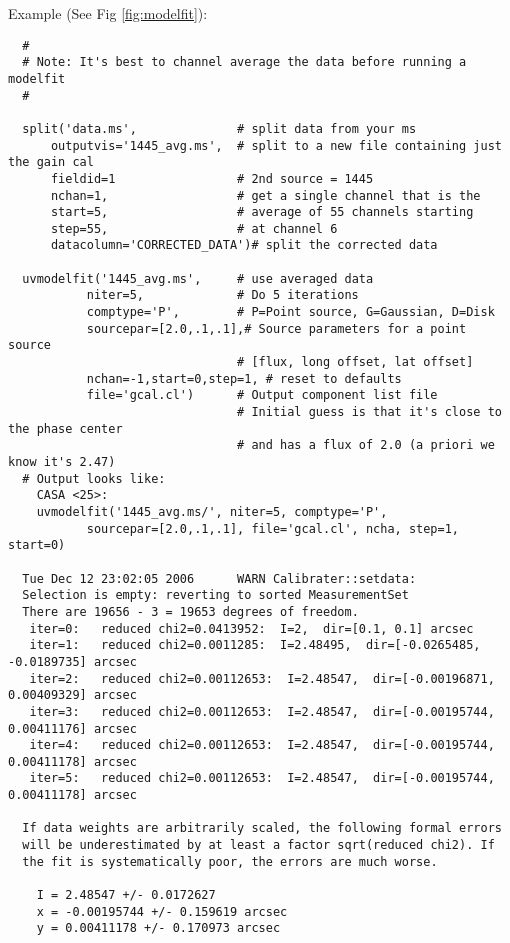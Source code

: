 Example (See Fig \ref{fig:modelfit}):

\small
\begin{verbatim}
  #
  # Note: It's best to channel average the data before running a modelfit
  #

  split('data.ms',              # split data from your ms
      outputvis='1445_avg.ms',  # split to a new file containing just the gain cal
      fieldid=1                 # 2nd source = 1445
      nchan=1,                  # get a single channel that is the
      start=5,                  # average of 55 channels starting
      step=55,                  # at channel 6
      datacolumn='CORRECTED_DATA')# split the corrected data

  uvmodelfit('1445_avg.ms',     # use averaged data
           niter=5,             # Do 5 iterations
           comptype='P',        # P=Point source, G=Gaussian, D=Disk
           sourcepar=[2.0,.1,.1],# Source parameters for a point source
                                # [flux, long offset, lat offset]
           nchan=-1,start=0,step=1, # reset to defaults
           file='gcal.cl')      # Output component list file
                                # Initial guess is that it's close to the phase center
                                # and has a flux of 2.0 (a priori we know it's 2.47)
  # Output looks like:
    CASA <25>:
    uvmodelfit('1445_avg.ms/', niter=5, comptype='P',
           sourcepar=[2.0,.1,.1], file='gcal.cl', ncha, step=1, start=0) 

  Tue Dec 12 23:02:05 2006      WARN Calibrater::setdata:
  Selection is empty: reverting to sorted MeasurementSet
  There are 19656 - 3 = 19653 degrees of freedom.
   iter=0:   reduced chi2=0.0413952:  I=2,  dir=[0.1, 0.1] arcsec
   iter=1:   reduced chi2=0.0011285:  I=2.48495,  dir=[-0.0265485, -0.0189735] arcsec
   iter=2:   reduced chi2=0.00112653:  I=2.48547,  dir=[-0.00196871, 0.00409329] arcsec
   iter=3:   reduced chi2=0.00112653:  I=2.48547,  dir=[-0.00195744, 0.00411176] arcsec
   iter=4:   reduced chi2=0.00112653:  I=2.48547,  dir=[-0.00195744, 0.00411178] arcsec
   iter=5:   reduced chi2=0.00112653:  I=2.48547,  dir=[-0.00195744, 0.00411178] arcsec

  If data weights are arbitrarily scaled, the following formal errors
  will be underestimated by at least a factor sqrt(reduced chi2). If 
  the fit is systematically poor, the errors are much worse.

    I = 2.48547 +/- 0.0172627
    x = -0.00195744 +/- 0.159619 arcsec
    y = 0.00411178 +/- 0.170973 arcsec


\end{verbatim}
